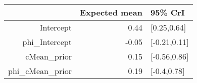 \begin{tabular}{rrl}
  \hline
 & Expected mean & 95\% CrI \\ 
  \hline
Intercept & 0.44 & [0.25,0.64] \\ 
  phi\_Intercept & -0.05 & [-0.21,0.11] \\ 
  cMean\_prior & 0.15 & [-0.56,0.86] \\ 
  phi\_cMean\_prior & 0.19 & [-0.4,0.78] \\ 
   \hline
\end{tabular}

